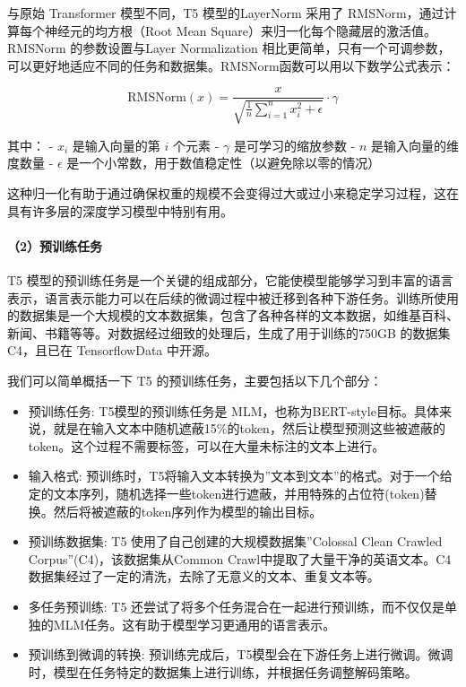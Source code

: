 \documentclass[
]{article}
\providecommand{\tightlist}{%
  \setlength{\itemsep}{0pt}\setlength{\parskip}{0pt}}
\begin{document}
与原始 Transformer 模型不同，T5 模型的LayerNorm 采用了
RMSNorm，通过计算每个神经元的均方根（Root Mean
Square）来归一化每个隐藏层的激活值。RMSNorm 的参数设置与Layer
Normalization
相比更简单，只有一个可调参数，可以更好地适应不同的任务和数据集。RMSNorm函数可以用以下数学公式表示：

\[
\text{RMSNorm}(x) = \frac{x}{\sqrt{\frac{1}{n}\sum_{i=1}^{n}x_i^2 + \epsilon}} \cdot \gamma
\]

其中： - \(x_i\) 是输入向量的第 \(i\) 个元素 - \(\gamma\)
是可学习的缩放参数 - \(n\) 是输入向量的维度数量 - \(\epsilon\)
是一个小常数，用于数值稳定性（以避免除以零的情况）

这种归一化有助于通过确保权重的规模不会变得过大或过小来稳定学习过程，这在具有许多层的深度学习模型中特别有用。

\paragraph{（2）预训练任务}\label{ux9884ux8badux7ec3ux4efbux52a1}

T5
模型的预训练任务是一个关键的组成部分，它能使模型能够学习到丰富的语言表示，语言表示能力可以在后续的微调过程中被迁移到各种下游任务。训练所使用的数据集是一个大规模的文本数据集，包含了各种各样的文本数据，如维基百科、新闻、书籍等等。对数据经过细致的处理后，生成了用于训练的750GB
的数据集 C4，且已在 TensorflowData 中开源。

我们可以简单概括一下 T5 的预训练任务，主要包括以下几个部分：

\begin{itemize}
\tightlist
\item
  预训练任务: T5模型的预训练任务是
  MLM，也称为BERT-style目标。具体来说，就是在输入文本中随机遮蔽15\%的token，然后让模型预测这些被遮蔽的token。这个过程不需要标签，可以在大量未标注的文本上进行。
\item
  输入格式:
  预训练时，T5将输入文本转换为''文本到文本''的格式。对于一个给定的文本序列，随机选择一些token进行遮蔽，并用特殊的占位符(token)替换。然后将被遮蔽的token序列作为模型的输出目标。
\item
  预训练数据集: T5 使用了自己创建的大规模数据集''Colossal Clean Crawled
  Corpus''(C4)，该数据集从Common
  Crawl中提取了大量干净的英语文本。C4数据集经过了一定的清洗，去除了无意义的文本、重复文本等。
\item
  多任务预训练: T5
  还尝试了将多个任务混合在一起进行预训练，而不仅仅是单独的MLM任务。这有助于模型学习更通用的语言表示。
\item
  预训练到微调的转换:
  预训练完成后，T5模型会在下游任务上进行微调。微调时，模型在任务特定的数据集上进行训练，并根据任务调整解码策略。
\end{itemize}
\end{document}
